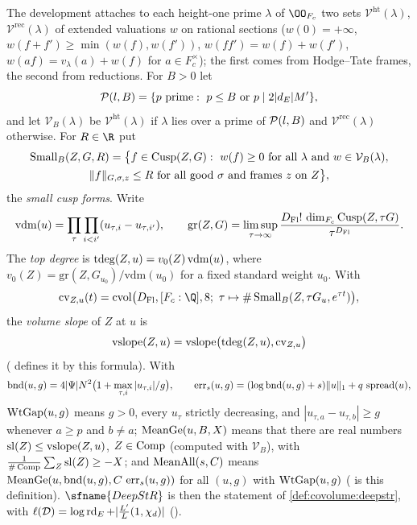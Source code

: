 The development attaches to each height-one prime $\lambda$ of $\OO_{F_c}$ two sets $\mathcal V^{\mathrm{ht}}(\lambda)$,
$\mathcal V^{\mathrm{rec}}(\lambda)$ of extended valuations $w$ on rational sections ($w(0)=+\infty$,
$w(f+f')\ge\min(w(f),w(f'))$, $w(ff')=w(f)+w(f')$, $w(af)=v_\lambda(a)+w(f)$ for $a\in F_c^\times$); the
first comes from Hodge--Tate frames, the second from reductions. For $B>0$ let
\begin{equation}\label{eq:pf:deepstr:htprimes}
\deepstrPrimes(l,B)=\{p\text{ prime}:\ p\le B\ \text{or}\ p\mid2|d_E|M'\},
\end{equation}
and let $\mathcal V_B(\lambda)$ be $\mathcal V^{\mathrm{ht}}(\lambda)$ if $\lambda$ lies over a prime of
$\mathcal{P}(l,B)$ and $\mathcal V^{\mathrm{rec}}(\lambda)$ otherwise. For $R\in\R$ put
\begin{multline*}
\operatorname{Small}_B(Z,G,R)=\bigl\{f\in\operatorname{Cusp}(Z,G):\ w(f)\ge0\text{ for all }\lambda\text{ and }w\in\mathcal V_B(\lambda),\\
\|f\|_{G,\sigma,z}\le R\ \text{for all good }\sigma\text{ and frames }z\text{ on }Z\bigr\},
\end{multline*}
the \emph{small cusp forms}. Write
\[
\mathrm{vdm}(u)=\prod_\tau\prod_{i<i'}(u_{\tau,i}-u_{\tau,i'}),\qquad
\mathrm{gr}(Z,G)=\limsup_{\tau\to\infty}\frac{D_{\mathrm{Fl}}!\,\dim_{F_c}\operatorname{Cusp}(Z,\tau G)}{\tau^{D_{\mathrm{Fl}}}}.
\]
The \emph{top degree} is $\operatorname{tdeg}(Z,u)=v_0(Z)\,\mathrm{vdm}(u)$, where
$v_0(Z)=\mathrm{gr}(Z,G_{u_0})/\mathrm{vdm}(u_0)$ for a fixed standard weight $u_0$. With
\[
\mathrm{cv}_{Z,u}(t)=\deepstrcvol\bigl(\deepstrDim,[F_c:\Q],8;\ \tau\mapsto\#\deepstrsmall_B(Z,\tau G_u,e^{\tau t})\bigr),
\]
the \emph{volume slope} of $Z$ at $u$ is
\begin{equation}\label{eq:pf:deepstr:compvol}
\operatorname{vslope}(Z,u)=\operatorname{vslope}\bigl(\operatorname{tdeg}(Z,u),\mathrm{cv}_{Z,u}\bigr)
\end{equation}
( defines it by this formula). With
\begin{gather*}
\operatorname{bnd}(u,g)=4|\Psi|N^2\bigl(1+\max_{\tau,i}|u_{\tau,i}|/g\bigr),\qquad
\operatorname{err}_s(u,g)=(\log\operatorname{bnd}(u,g)+s)\|u\|_1+q\,\operatorname{spread}(u),
\end{gather*}
$\operatorname{WtGap}(u,g)$ means $g>0$, every $u_\tau$ strictly decreasing, and $|u_{\tau,a}-u_{\tau,b}|\ge g$
whenever $a\ge p$ and $b\ne a$; $\operatorname{MeanGe}(u,B,X)$ means that there are real numbers
$\mathrm{sl}(Z)\le\operatorname{vslope}(Z,u)$, $Z\in\operatorname{Comp}$ (computed with $\mathcal V_B$), with
$\frac1{\#\operatorname{Comp}}\sum_Z\mathrm{sl}(Z)\ge-X$; and $\operatorname{MeanAll}(s,C)$ means
$\operatorname{MeanGe}(u,\operatorname{bnd}(u,g),C\,\operatorname{err}_s(u,g))$ for all $(u,g)$ with $\operatorname{WtGap}(u,g)$
( is this definition). $\sfname{DeepStR}$ is then the statement of
\cref{def:covolume:deepstr}, with $\ell(\mathcal D)=\log\operatorname{rd}_E+|\frac{L'}{L}(1,\chi_d)|$
().

